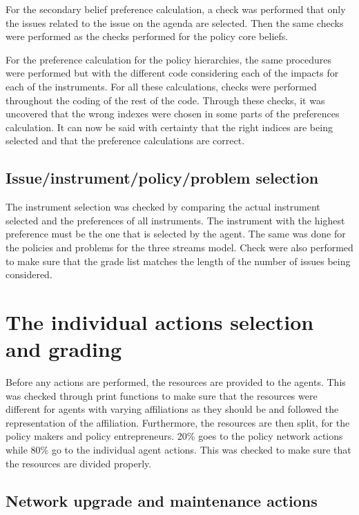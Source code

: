 For the secondary belief preference calculation, a check was performed that only the issues related to the issue on the agenda are selected. Then the same checks were performed as the checks performed for the policy core beliefs.

For the preference calculation for the policy hierarchies, the same procedures were performed but with the different code considering each of the impacts for each of the instruments. For all these calculations, checks were performed throughout the coding of the rest of the code. Through these checks, it was uncovered that the wrong indexes were chosen in some parts of the preferences calculation. It can now be said with certainty that the right indices are being selected and that the preference calculations are correct.

\subsection{Issue/instrument/policy/problem selection}

The instrument selection was checked by comparing the actual instrument selected and the preferences of all instruments. The instrument with the highest preference must be the one that is selected by the agent. The same was done for the policies and problems for the three streams model. Check were also performed to make sure that the grade list matches the length of the number of issues being considered.

\section{The individual actions selection and grading}

Before any actions are performed, the resources are provided to the agents. This was checked through print functions to make sure that the resources were different for agents with varying affiliations as they should be and followed the representation of the affiliation. Furthermore, the resources are then split, for the policy makers and policy entrepreneurs. 20\% goes to the policy network actions while 80\% go to the individual agent actions. This was checked to make sure that the resources are divided properly.

\subsection{Network upgrade and maintenance actions}


